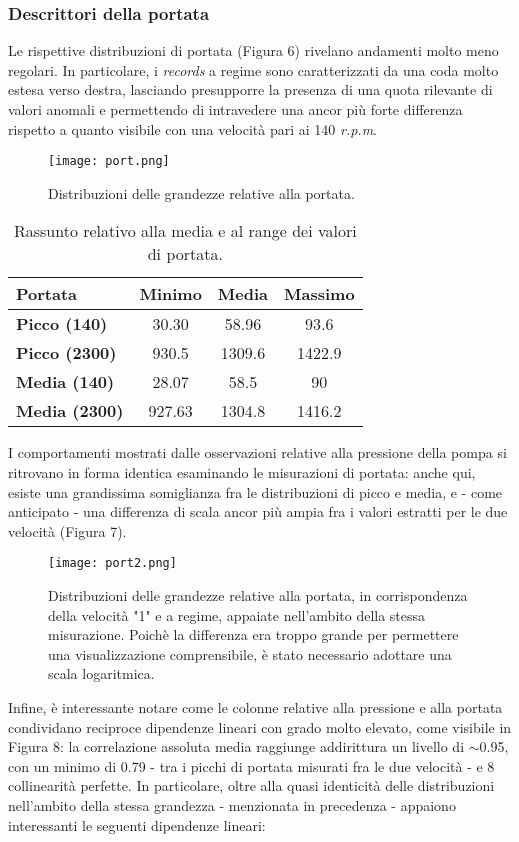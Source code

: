 \documentclass[fleqn,10pt]{SelfArx} %
\begin{document}
\subsubsection{Descrittori della portata}
Le rispettive distribuzioni di portata (Figura 6) rivelano andamenti molto meno regolari. In particolare, i \textit{records} a regime sono caratterizzati da una coda molto estesa verso destra, lasciando presupporre la presenza di una  quota rilevante di valori anomali e permettendo di intravedere una ancor più forte differenza rispetto a quanto visibile con una velocità pari ai 140 \textit{r.p.m}.  
\begin{figure}[h]
    \centering
    \texttt{[image: port.png]}
    \label{fig:em}
    \caption{Distribuzioni delle grandezze relative alla portata.}
\end{figure}
{\begin{table}[h]
\centering
\begin{tabular}[t]{lccc}
\toprule
Portata&Minimo&Media&Massimo\\
\midrule
\textbf{Picco (140)}&30.30&58.96&93.6\\
\textbf{Picco (2300)}&930.5&1309.6&1422.9\\
\textbf{Media (140)}&28.07&58.5&90\\
\textbf{Media (2300)}&927.63&1304.8&1416.2\\
\bottomrule
\end{tabular}
\caption{Rassunto relativo alla media e al range dei valori di portata.}
\end{table}}
I comportamenti mostrati dalle osservazioni relative alla pressione della pompa si ritrovano in forma identica esaminando le misurazioni di portata: anche qui, esiste una grandissima somiglianza fra le distribuzioni di picco e media, e - come anticipato - una differenza di scala ancor più ampia fra i valori estratti per le due velocità (Figura 7).
\begin{figure}[H]
    \centering
    \texttt{[image: port2.png]}
    \label{fig:em}
    \caption{Distribuzioni delle grandezze relative alla portata, in corrispondenza della velocità "1" e a regime, appaiate nell'ambito della stessa misurazione. Poichè la differenza era troppo grande per permettere una visualizzazione comprensibile, è stato necessario adottare una scala logaritmica.}
\end{figure}
Infine, è interessante notare come le colonne relative alla pressione e alla portata condividano reciproce dipendenze lineari con grado molto elevato, come visibile in Figura 8: la correlazione assoluta media raggiunge addirittura un livello di $\sim$0.95, con un minimo di 0.79 - tra i picchi di portata misurati fra le due velocità - e 8 collinearità perfette. In particolare, oltre alla quasi identicità delle distribuzioni nell'ambito della stessa grandezza - menzionata in precedenza - appaiono interessanti le seguenti dipendenze lineari:
\end{document}
